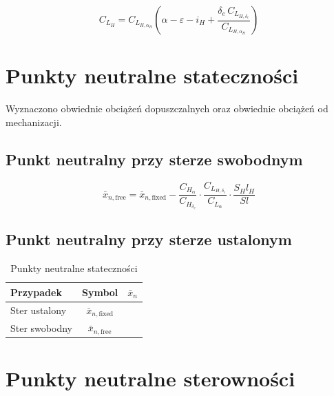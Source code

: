 \documentclass[12pt, a4paper]{article}
\begin{document}
\begin{equation}
  C_{L_H} = C_{L_{H,\alpha_H}} \left( \alpha - \varepsilon - i_H + \frac{\delta_e\,C_{L_{H,\delta_e}}}{C_{L_{H,\alpha_H}}} \right)
  \label{eq:CLH}
\end{equation}

\section{Punkty neutralne stateczności}

Wyznaczono obwiednie obciążeń dopuszczalnych oraz obwiednie obciążeń od mechanizacji.

\subsection{Punkt neutralny przy sterze swobodnym}

\begin{equation}
  \bar{x}_{n,\text{free}} = \bar{x}_{n,\text{fixed}} - \frac{C_{H_\alpha}}{C_{H_{\delta_e}}} \cdot
  \frac{C_{L_{H,\delta_e}}}{C_{L_\alpha}} \cdot \frac{S_H l_H}{S l}
  \label{eq:xn_free}
\end{equation}

\subsection{Punkt neutralny przy sterze ustalonym}

\begin{table}[H]
  \centering
  \caption{Punkty neutralne stateczności}
  \label{tab:pkt_neutralne_stat}
  \begin{tabular}{lcc}
    \toprule
    \textbf{Przypadek} & \textbf{Symbol} & $\bar{x}_n$ \\
    \midrule
    Ster ustalony & $\bar{x}_{n,\text{fixed}}$ & \\
    Ster swobodny & $\bar{x}_{n,\text{free}}$  & \\
    \bottomrule
  \end{tabular}
\end{table}

\section{Punkty neutralne sterowności}
\end{document}
